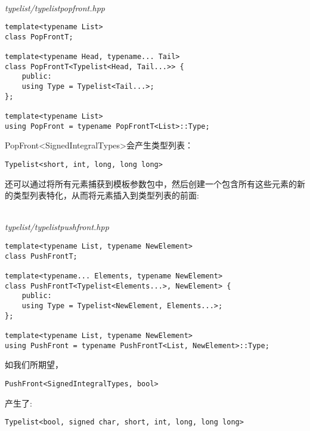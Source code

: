 \hspace*{\fill} \\ %
\noindent
\textit{typelist/typelistpopfront.hpp}
\begin{lstlisting}[style=styleCXX]
template<typename List>
class PopFrontT;

template<typename Head, typename... Tail>
class PopFrontT<Typelist<Head, Tail...>> {
	public:
	using Type = Typelist<Tail...>;
};

template<typename List>
using PopFront = typename PopFrontT<List>::Type;
\end{lstlisting}

PopFront<SignedIntegralTypes>会产生类型列表：

\begin{lstlisting}[style=styleCXX]
Typelist<short, int, long, long long>
\end{lstlisting}

还可以通过将所有元素捕获到模板参数包中，然后创建一个包含所有这些元素的新的类型列表特化，从而将元素插入到类型列表的前面:

\hspace*{\fill} \\ %
\noindent
\textit{typelist/typelistpushfront.hpp}
\begin{lstlisting}[style=styleCXX]
template<typename List, typename NewElement>
class PushFrontT;

template<typename... Elements, typename NewElement>
class PushFrontT<Typelist<Elements...>, NewElement> {
	public:
	using Type = Typelist<NewElement, Elements...>;
};

template<typename List, typename NewElement>
using PushFront = typename PushFrontT<List, NewElement>::Type;
\end{lstlisting}

如我们所期望，

\begin{lstlisting}[style=styleCXX]
PushFront<SignedIntegralTypes, bool>
\end{lstlisting}

产生了:

\begin{lstlisting}[style=styleCXX]
Typelist<bool, signed char, short, int, long, long long>
\end{lstlisting}










